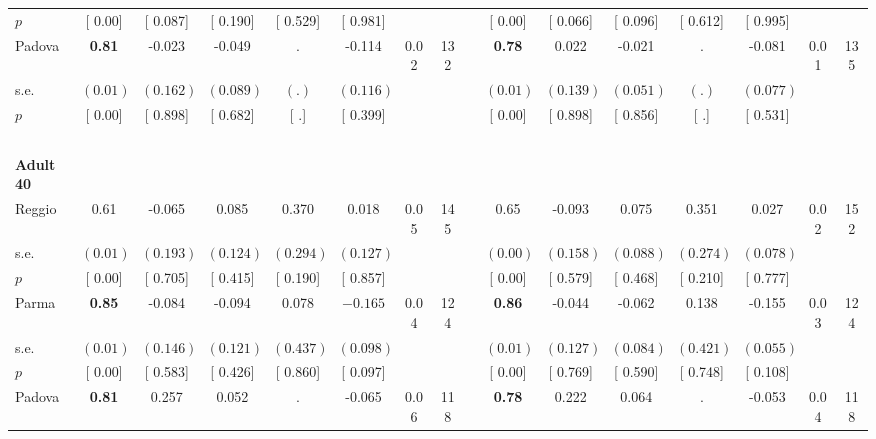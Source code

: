 \begin{longtable}{L{8em} c c c c c c c p{1em} c c c c c c c}
\quad \quad \quad \quad $ p$ & [     0.00] & [    0.087] & [    0.190] & [    0.529] & [    0.981] & & & & [     0.00] & [    0.066] & [    0.096] & [    0.612] & [    0.995] & &  \\[1em]
\quad \quad \quad Padova& \textbf{     0.81} &    -0.023 &    -0.049 &         . &    -0.114 &      0.02 &       132 & & \textbf{     0.78} &     0.022 &    -0.021 &         . &    -0.081 &      0.01 &       135  \\*
\quad \quad \quad \quad s.e.& $ (     0.01)$ & $ (    0.162)$ & $ (    0.089)$ & $ (        .)$ & $ (    0.116)$ & & & & $ (     0.01)$ & $ (    0.139)$ & $ (    0.051)$ & $ (        .)$ & $ (    0.077)$ & &  \\*
\quad \quad \quad \quad $ p$ & [     0.00] & [    0.898] & [    0.682] & [        .] & [    0.399] & & & & [     0.00] & [    0.898] & [    0.856] & [        .] & [    0.531] & &  \\[1em]
~\\[1em]
\quad \quad \textbf{Adult 40} & & & & & & & & & & & & & & & \\* 
\quad \quad \quad Reggio& 0.61 &    -0.065 &     0.085 &     0.370 &     0.018 &      0.05 &       145 & & 0.65 &    -0.093 &     0.075 &     0.351 &     0.027 &      0.02 &       152  \\*
\quad \quad \quad \quad s.e.& $ (     0.01)$ & $ (    0.193)$ & $ (    0.124)$ & $ (    0.294)$ & $ (    0.127)$ & & & & $ (     0.00)$ & $ (    0.158)$ & $ (    0.088)$ & $ (    0.274)$ & $ (    0.078)$ & &  \\*
\quad \quad \quad \quad $ p$ & [     0.00] & [    0.705] & [    0.415] & [    0.190] & [    0.857] & & & & [     0.00] & [    0.579] & [    0.468] & [    0.210] & [    0.777] & &  \\[1em]
\quad \quad \quad Parma& \textbf{     0.85} &    -0.084 &    -0.094 &     0.078 & $ \mathbf{   -0.165}$ &      0.04 &       124 & & \textbf{     0.86} &    -0.044 &    -0.062 &     0.138 &    -0.155 &      0.03 &       124  \\*
\quad \quad \quad \quad s.e.& $ (     0.01)$ & $ (    0.146)$ & $ (    0.121)$ & $ (    0.437)$ & $ (    0.098)$ & & & & $ (     0.01)$ & $ (    0.127)$ & $ (    0.084)$ & $ (    0.421)$ & $ (    0.055)$ & &  \\*
\quad \quad \quad \quad $ p$ & [     0.00] & [    0.583] & [    0.426] & [    0.860] & [    0.097] & & & & [     0.00] & [    0.769] & [    0.590] & [    0.748] & [    0.108] & &  \\[1em]
\quad \quad \quad Padova& \textbf{     0.81} &     0.257 &     0.052 &         . &    -0.065 &      0.06 &       118 & & \textbf{     0.78} &     0.222 &     0.064 &         . &    -0.053 &      0.04 &       118  \\*

\end{longtable}
